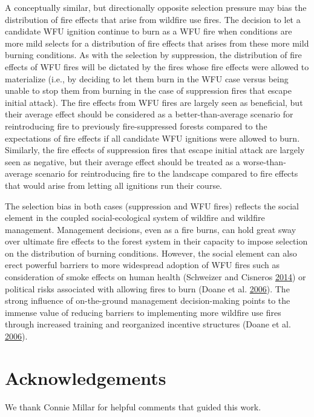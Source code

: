 \documentclass[twoside,12pt,final]{ucthesis-CA2012}
\begin{document}
\begin{ucmainmatter}
A conceptually similar, but directionally opposite selection pressure
may bias the distribution of fire effects that arise from wildfire use
fires. The decision to let a candidate WFU ignition continue to burn as
a WFU fire when conditions are more mild selects for a distribution of
fire effects that arises from these more mild burning conditions. As
with the selection by suppression, the distribution of fire effects of
WFU fires will be dictated by the fires whose fire effects were allowed
to materialize (i.e., by deciding to let them burn in the WFU case
versus being unable to stop them from burning in the case of suppression
fires that escape initial attack). The fire effects from WFU fires are
largely seen as beneficial, but their average effect should be
considered as a better-than-average scenario for reintroducing fire to
previously fire-suppressed forests compared to the expectations of fire
effects if all candidate WFU ignitions were allowed to burn. Similarly,
the fire effects of suppression fires that escape initial attack are
largely seen as negative, but their average effect should be treated as
a worse-than-average scenario for reintroducing fire to the landscape
compared to fire effects that would arise from letting all ignitions run
their course.

The selection bias in both cases (suppression and WFU fires) reflects
the social element in the coupled social-ecological system of wildfire
and wildfire management. Management decisions, even as a fire burns, can
hold great sway over ultimate fire effects to the forest system in their
capacity to impose selection on the distribution of burning conditions.
However, the social element can also erect powerful barriers to more
widespread adoption of WFU fires such as consideration of smoke effects
on human health (Schweizer and Cisneros
\protect\hyperlink{ref-schweizer2014}{2014}) or political risks
associated with allowing fires to burn (Doane et al.
\protect\hyperlink{ref-doane2006}{2006}). The strong influence of
on-the-ground management decision-making points to the immense value of
reducing barriers to implementing more wildfire use fires through
increased training and reorganized incentive structures (Doane et al.
\protect\hyperlink{ref-doane2006}{2006}).

\section{Acknowledgements}\label{acknowledgements-2}

We thank Connie Millar for helpful comments that guided this work.


\end{ucmainmatter}
\end{document}
